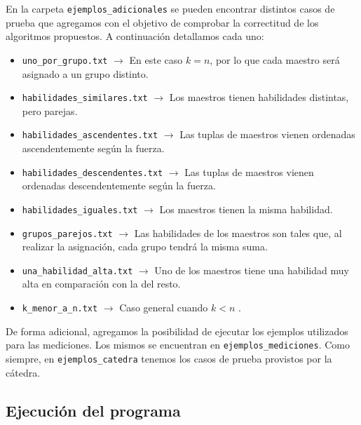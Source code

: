 \documentclass{article}
\begin{document}
En la carpeta \texttt{ejemplos\_adicionales} se pueden encontrar distintos casos de prueba que agregamos con el objetivo de comprobar la correctitud de los algoritmos propuestos. A continuación detallamos cada uno:
\begin{itemize}
    \item \texttt{uno\_por\_grupo.txt} $\rightarrow$ En este caso $k = n$, por lo que cada maestro será asignado a un grupo distinto.
    \item \texttt{habilidades\_similares.txt} $\rightarrow$ Los maestros tienen habilidades distintas, pero parejas.
    \item \texttt{habilidades\_ascendentes.txt} $\rightarrow$ Las tuplas de maestros vienen ordenadas ascendentemente según la fuerza.
    \item \texttt{habilidades\_descendentes.txt} $\rightarrow$ Las tuplas de maestros vienen ordenadas descendentemente según la fuerza.
    \item \texttt{habilidades\_iguales.txt} $\rightarrow$ Los maestros tienen la misma habilidad.
    \item \texttt{grupos\_parejos.txt} $\rightarrow$ Las habilidades de los maestros son tales que, al realizar la asignación, cada grupo tendrá la misma suma.
    \item \texttt{una\_habilidad\_alta.txt} $\rightarrow$ Uno de los maestros tiene una habilidad muy alta en comparación con la del resto.
    \item \texttt{k\_menor\_a\_n.txt} $\rightarrow$ Caso general cuando $k < n$ .
\end{itemize}

De forma adicional, agregamos la posibilidad de ejecutar los ejemplos utilizados para las mediciones. Los mismos se encuentran en \texttt{ejemplos\_mediciones}. Como siempre, en \texttt{ejemplos\_catedra} tenemos los casos de prueba provistos por la cátedra.

\subsection{Ejecución del programa}
\end{document}
